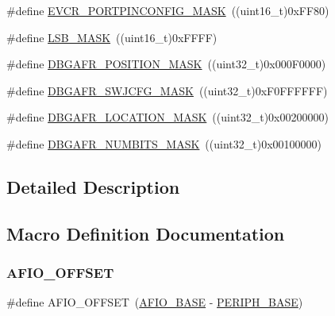 \begin{DoxyCompactItemize}
\item 
\#define \hyperlink{group___g_p_i_o___private___defines_ga97d20e77a588a767e1a775dd4299d1c5}{E\+V\+C\+R\+\_\+\+P\+O\+R\+T\+P\+I\+N\+C\+O\+N\+F\+I\+G\+\_\+\+M\+A\+SK}~((uint16\+\_\+t)0x\+F\+F80)
\item 
\#define \hyperlink{group___g_p_i_o___private___defines_ga338d54179ac0da2af2363e3a930bf374}{L\+S\+B\+\_\+\+M\+A\+SK}~((uint16\+\_\+t)0x\+F\+F\+F\+F)
\item 
\#define \hyperlink{group___g_p_i_o___private___defines_gafa4eba58b1839413acb4591da00e7559}{D\+B\+G\+A\+F\+R\+\_\+\+P\+O\+S\+I\+T\+I\+O\+N\+\_\+\+M\+A\+SK}~((uint32\+\_\+t)0x000\+F0000)
\item 
\#define \hyperlink{group___g_p_i_o___private___defines_ga47a1cd3c0505a7be3e161671237d8460}{D\+B\+G\+A\+F\+R\+\_\+\+S\+W\+J\+C\+F\+G\+\_\+\+M\+A\+SK}~((uint32\+\_\+t)0x\+F0\+F\+F\+F\+F\+F\+F)
\item 
\#define \hyperlink{group___g_p_i_o___private___defines_gaab83406f875057e96458940ca9519b7d}{D\+B\+G\+A\+F\+R\+\_\+\+L\+O\+C\+A\+T\+I\+O\+N\+\_\+\+M\+A\+SK}~((uint32\+\_\+t)0x00200000)
\item 
\#define \hyperlink{group___g_p_i_o___private___defines_gaea2fa480dea4d6e061eaa1417a9196dc}{D\+B\+G\+A\+F\+R\+\_\+\+N\+U\+M\+B\+I\+T\+S\+\_\+\+M\+A\+SK}~((uint32\+\_\+t)0x00100000)
\end{DoxyCompactItemize}


\subsection{Detailed Description}


\subsection{Macro Definition Documentation}
\mbox{\label{group___g_p_i_o___private___defines_ga0ecdd0dd5180e1ee385c22f66a2cd660}} 
\subsubsection{\texorpdfstring{A\+F\+I\+O\+\_\+\+O\+F\+F\+S\+ET}{AFIO\_OFFSET}}
{\footnotesize\ttfamily \#define A\+F\+I\+O\+\_\+\+O\+F\+F\+S\+ET~(\hyperlink{group___peripheral__memory__map_ga5f7e3eacfcf4c313c25012795148a680}{A\+F\+I\+O\+\_\+\+B\+A\+SE} -\/ \hyperlink{group___peripheral__memory__map_ga9171f49478fa86d932f89e78e73b88b0}{P\+E\+R\+I\+P\+H\+\_\+\+B\+A\+SE})}



